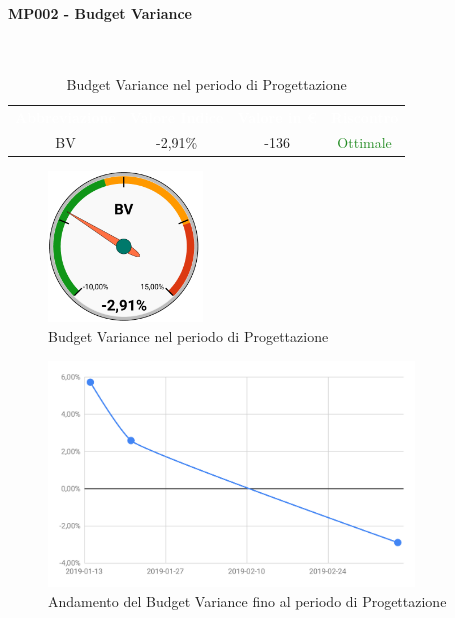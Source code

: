 \paragraph{MP002 - Budget Variance}\mbox{}\\[0,3cm]
\begin{table}[H]
    \centering
    \begin{tabular}{cccc}
        \rowcolor{greySWEight}
        \textcolor{white}{\textbf{Abbreviazione}} &
        \textcolor{white}{\textbf{Valore Indice}}&
        \textcolor{white}{\textbf{Valore in €}}&
        \textcolor{white}{\textbf{Riscontro}}\\
        BV & -2,91\% & -136 & \textcolor{ForestGreen}{Ottimale}\\
    \end{tabular}
    \caption{Budget Variance nel periodo di Progettazione}
\end{table}
\begin{figure}[H]
    \centering
	\includegraphics[height=4cm]{sez/App_Esito/Progettazione/graph/PR_BV.pdf}
	\caption{Budget Variance nel periodo di Progettazione}
\end{figure}
\begin{figure}[H]
	\centering
	\includegraphics[height=6cm]{sez/App_Esito/Progettazione/graph/PR_Storico_BV.pdf}
	\caption{Andamento del Budget Variance fino al periodo di Progettazione}
\end{figure}